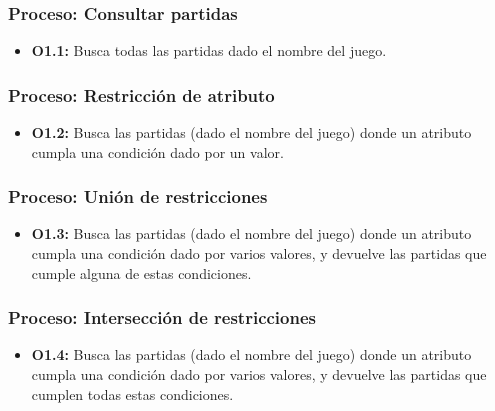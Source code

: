 \subsubsection{Proceso: Consultar partidas}

\begin{itemize}
	\item \textbf{O1.1:} Busca todas las partidas dado el nombre del juego.
\end{itemize}


\subsubsection{Proceso: Restricción de atributo}

\begin{itemize}
	\item \textbf{O1.2:} Busca las partidas (dado el nombre del juego) donde un atributo cumpla una condición dado por un valor.
\end{itemize}


\subsubsection{Proceso: Unión de restricciones}

\begin{itemize}
	\item \textbf{O1.3:} Busca las partidas (dado el nombre del juego) donde un atributo cumpla una condición dado por varios valores, y devuelve las partidas que cumple alguna de estas condiciones.
\end{itemize}


\subsubsection{Proceso: Intersección de restricciones}

\begin{itemize}
	\item \textbf{O1.4:} Busca las partidas (dado el nombre del juego) donde un atributo cumpla una condición dado por varios valores, y devuelve las partidas que cumplen todas estas condiciones.
\end{itemize}

